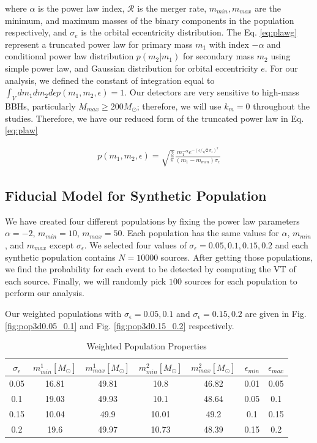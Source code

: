 \documentclass[twocolumn,prd,nofootinbib]{revtex4}
\begin{document}
where $\alpha$ is the power law index, $\mathcal{R}$ is the merger rate, $m_{min}, m_{max}$ are the minimum, and maximum masses of the binary components in the population respectively, and $\sigma_e$ is the orbital eccentricity distribution. The Eq. \ref{eq:plawg} represent a truncated power law for primary mass $m_1$ with index $-\alpha$ and conditional power law distribution $p(m_2|m_1)$ for secondary mass $m_2$ using simple power law, and Gaussian distribution for orbital eccentricity $e$. 
For our analysis, we defined the constant of integration equal to $\int_V dm_1 dm_2 d\epsilon p(m_1,m_2,\epsilon) = 1$.  Our detectors are very sensitive to high-mass BBHs, particularly $M_{max}\geq 200 M_\odot$; therefore, we will use $k_m=0$ throughout the studies. Therefore, we have our reduced form of the truncated power law in Eq. \ref{eq:plaw}

\begin{align}
\label{eq:plaw}
p(m_1,m_2,\epsilon) = \sqrt{\frac{2}{\pi}} \frac{ m_1^{-\alpha}  e^{-(\epsilon/\sqrt{2}\sigma_\epsilon)^2}}{(m_1-m_{min})\sigma_\epsilon}
\end{align}


\subsection{Fiducial Model for Synthetic Population}

We have created four different populations by fixing the
power law parameters $\alpha = -2$, $m_{min} = 10$, $m_{max}=50$. Each population has the same values for $\alpha$, $m_{min}$, and $m_{max}$ except $\sigma_\epsilon$. We selected four values of $\sigma_\epsilon = 0.05,0.1,0.15,0.2$ and each synthetic population contains $N=10000$ sources. After getting those populations, we find the probability for each event to be detected by computing the VT of each source. Finally, we will randomly pick $100$ sources for each population to perform our analysis.

Our weighted populations with $\sigma_\epsilon=0.05, 0.1$ and $\sigma_\epsilon=0.15, 0.2$ are given in Fig. \ref{fig:pop3d0.05_0.1} and Fig. \ref{fig:pop3d0.15_0.2} respectively. 
 

\begin{table}[]
    \centering
    \begin{tabular}{|ccccccc|}
        \hline
        $\sigma_\epsilon$ & $m^1_{min} [M_\odot] $ & $m^1_{max} [M_\odot]$ & $m^2_{min} [M_\odot]$ & $m^2_{max} [M_\odot]$ & $\epsilon_{min}$ & $\epsilon_{max}$\\ \hline
        0.05 & 16.81 & 49.81 & 10.8 & 46.82 & 0.01 & 0.05\\ \hline
        0.1 & 19.03 & 49.93 & 10.1 & 48.64 & 0.05 & 0.1\\ \hline
        0.15 & 10.04 & 49.9 & 10.01 & 49.2 & 0.1 & 0.15\\ \hline
        0.2 & 19.6 & 49.97 & 10.73 & 48.39 & 0.15 & 0.2\\ \hline
    \end{tabular}
    \caption{Weighted Population Properties}
    \label{tab:pop_prop}
\end{table}
\end{document}
